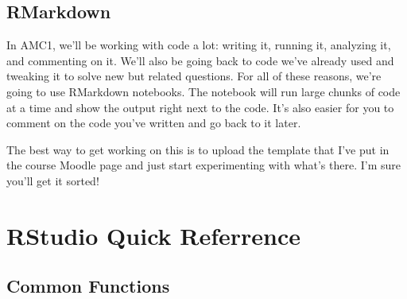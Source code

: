 \documentclass[
]{book}
\begin{document}
\hypertarget{rmarkdown}{%
\section{RMarkdown}\label{rmarkdown}}

In AMC1, we'll be working with code a lot: writing it, running it, analyzing it, and commenting on it. We'll also be going back to code we've already used and tweaking it to solve new but related questions. For all of these reasons, we're going to use RMarkdown notebooks. The notebook will run large chunks of code at a time and show the output right next to the code. It's also easier for you to comment on the code you've written and go back to it later.

The best way to get working on this is to upload the template that I've put in the course Moodle page and just start experimenting with what's there. I'm sure you'll get it sorted!

\hypertarget{rstudio-quick-referrence}{%
\chapter{RStudio Quick Referrence}\label{rstudio-quick-referrence}}

\hypertarget{common-functions}{%
\section{Common Functions}\label{common-functions}}
\end{document}

